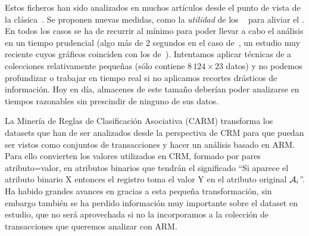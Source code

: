 Estos ficheros han sido analizados en muchos artículos desde el punto de vista de la \arm clásica~\citep{Suzuki-DiscoveringInterestingExceptionRulesWithRulePair-2004, Borgelt-EfficientImplementationsOfAprioriAndEclat-2004, ThabtahCowlingHammoud-ImprovingRuleSorting-2006, WangXinCoenen-MiningEfficientlySignificantCAR-2008, LiZhang-MiningMaximalFIOnGraphicsProcessors-2010, MalikRaheja-ImprovingPerformanceOfFrequentItemsetAlgorithm-2013, RituArora-IntensificationOfExecutionOfFrequentItemSetAlgorithms-2014, SahooKumarGoswami-AnAlgorithmForMiningHighUtilityClosedItemsetsAndGenerators-2014}. Se proponen nuevas medidas, como la \emph{utilidad} de los \itemsets~\citep{WuShie-MiningTopKHighUtilityItemsets-2012} para aliviar el \dilemaIR. En todos los casos se ha de recurrir al \soporte mínimo para poder llevar a cabo el análisis en un tiempo prudencial (algo más de 2 segundos en el caso de~\citeauthor{RituArora-IntensificationOfExecutionOfFrequentItemSetAlgorithms-2014}, un estudio muy reciente cuyos gráficos coinciden con los de~\citeauthor{MalikRaheja-ImprovingPerformanceOfFrequentItemsetAlgorithm-2013}). Intentamos aplicar técnicas de \dm a colecciones relativamente pequeñas (\mushroom sólo contiene $8\,124 \times 23$ datos) y no podemos profundizar o trabajar en tiempo real si no aplicamos recortes drásticos de información. Hoy en día, almacenes \D de este tamaño deberían poder analizarse en tiempos razonables sin prescindir de ninguno de sus datos.

La Minería de Reglas de Clasificación Asociativa (CARM) transforma los datasets que han de ser analizados desde la perspectiva de CRM para que puedan ser vistos como conjuntos de transacciones y hacer un análisis basado en ARM. Para ello convierten los valores utilizados en CRM, formado por pares atributo=valor, en atributos binarios que tendrán el significado ``Si aparece el atributo binario X entonces el registro toma el valor Y en el atributo original $\A_i$''. Ha habido grandes avances en \Clasificacion gracias a esta pequeña transformación, sin embargo también se ha perdido información muy importante sobre el dataset en estudio, que no será aprovechada si no la incorporamos a la colección de transacciones que queremos analizar con ARM.

